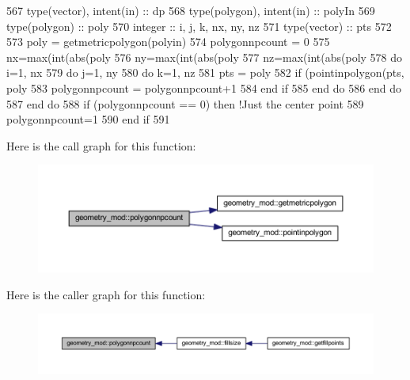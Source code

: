 \begin{DoxyCode}
567     \textcolor{keywordtype}{type}(vector), \textcolor{keywordtype}{intent(in)} :: dp
568     \textcolor{keywordtype}{type}(polygon), \textcolor{keywordtype}{intent(in)} :: polyIn
569     \textcolor{keywordtype}{type}(polygon) :: poly
570     \textcolor{keywordtype}{integer} :: i, j, k, nx, ny, nz
571     \textcolor{keywordtype}{type}(vector) :: pts
572 
573     poly = getmetricpolygon(polyin)
574     polygonnpcount = 0
575     nx=max(int(abs(poly%
576     ny=max(int(abs(poly%
577     nz=max(int(abs(poly%
578     \textcolor{keywordflow}{do} i=1, nx
579         \textcolor{keywordflow}{do} j=1, ny
580             \textcolor{keywordflow}{do} k=1, nz
581                 pts = poly%
582                 \textcolor{keywordflow}{if} (pointinpolygon(pts, poly%
583                     polygonnpcount = polygonnpcount+1
584 \textcolor{keywordflow}{                end if}
585 \textcolor{keywordflow}{            end do}
586 \textcolor{keywordflow}{        end do}
587 \textcolor{keywordflow}{    end do}
588     \textcolor{keywordflow}{if} (polygonnpcount == 0) \textcolor{keywordflow}{then} \textcolor{comment}{!Just the center point}
589         polygonnpcount=1
590 \textcolor{keywordflow}{    end if}
591 
\end{DoxyCode}
Here is the call graph for this function\+:\nopagebreak
\begin{figure}[H]
\begin{center}
\leavevmode
\includegraphics[width=350pt]{namespacegeometry__mod_aaffceaeb22689f0aaee4568c662f192a_cgraph}
\end{center}
\end{figure}
Here is the caller graph for this function\+:\nopagebreak
\begin{figure}[H]
\begin{center}
\leavevmode
\includegraphics[width=350pt]{namespacegeometry__mod_aaffceaeb22689f0aaee4568c662f192a_icgraph}
\end{center}
\end{figure}
\mbox{\label{namespacegeometry__mod_aed4426181ca851b41717edd50268e5f3}} 
